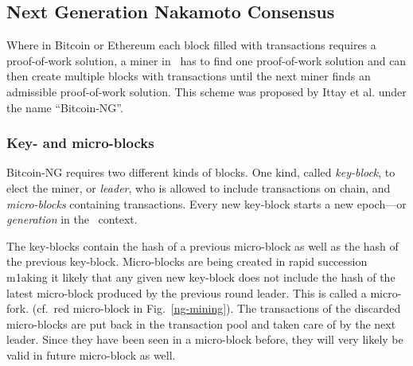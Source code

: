 

\subsection{Next Generation Nakamoto Consensus}

Where in Bitcoin or Ethereum each block filled with transactions requires
a proof-of-work solution, a miner in \aet\ has to find one proof-of-work
solution and can then create multiple blocks with transactions until the next
miner finds an admissible proof-of-work solution. This scheme was proposed by
Ittay et al. \cite{Eyal:2016:BSB:2930611.2930615} under the name \enquote{Bitcoin-NG}.

\subsubsection{Key- and micro-blocks}

Bitcoin-NG requires two different kinds of blocks. One kind, called
\textit{key-block}, to elect the miner, or \textit{leader}, who is allowed to
include transactions on chain, and \textit{micro-blocks} containing
transactions. Every new key-block starts a new epoch---or \textit{generation}
in the \aet\ context.

The key-blocks contain the hash of a previous micro-block as well as the hash
of the previous key-block.
Micro-blocks are being created in rapid succession m1aking it likely that any
given new key-block does not include the hash of the latest micro-block
produced by the previous round leader.
This is called a micro-fork. (cf.\ red micro-block in Fig.\
\ref{ng-mining}). The transactions of the discarded micro-blocks are put back
in the transaction pool and taken care of by the next leader. Since they have
been seen in a micro-block before, they will very likely be valid in
future micro-block as well.

